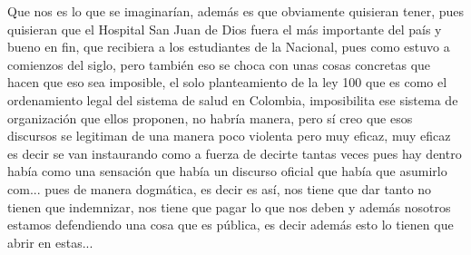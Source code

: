 Que nos es lo que se imaginarían, además es que obviamente quisieran tener, pues quisieran que el Hospital San Juan de Dios fuera el más importante del país y bueno en fin, que  recibiera a los estudiantes de la Nacional, pues como estuvo a comienzos del siglo, pero también eso se choca con unas cosas concretas que hacen que eso sea imposible, el solo planteamiento de la ley 100 que es como el ordenamiento legal del sistema de salud en Colombia, imposibilita ese sistema de organización que ellos proponen, no habría manera, pero sí creo que esos discursos se legitiman de una manera poco violenta pero muy eficaz, muy eficaz es decir se van instaurando como a fuerza de decirte tantas veces pues hay dentro había como una sensación que había un discurso oficial que había que asumirlo com... pues de manera dogmática, es decir es así, nos tiene que dar tanto no tienen que indemnizar, nos tiene que pagar lo que nos deben y además nosotros estamos defendiendo una cosa que es pública, es decir además esto lo tienen que abrir en estas...


